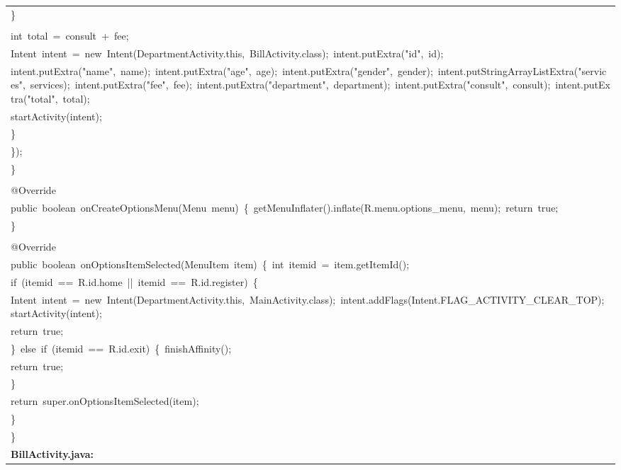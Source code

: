 \documentclass[a4paper,12pt]{article}
\begin{document}
\begin{longtable}{|p{}|}
{\ttfamily\small \}} \\
\strut \\
{\ttfamily\small int\ total\ =\ consult\ +\ fee;} \\
{\ttfamily\small Intent\ intent\ =\ new\ Intent(DepartmentActivity.this,\ BillActivity.class);\ intent.putExtra("id",\ id);} \\
{\ttfamily\small intent.putExtra("name",\ name);\ intent.putExtra("age",\ age);\ intent.putExtra("gender",\ gender);\ intent.putStringArrayListExtra("services",\ services);\ intent.putExtra("fee",\ fee);\ intent.putExtra("department",\ department);\ intent.putExtra("consult",\ consult);\ intent.putExtra("total",\ total);} \\
{\ttfamily\small startActivity(intent);} \\
{\ttfamily\small \}} \\
{\ttfamily\small \});} \\
{\ttfamily\small \}} \\
\strut \\
{\ttfamily\small @Override} \\
{\ttfamily\small public\ boolean\ onCreateOptionsMenu(Menu\ menu)\ \{\ getMenuInflater().inflate(R.menu.options\_menu,\ menu);\ return\ true;} \\
{\ttfamily\small \}} \\
\strut \\
{\ttfamily\small @Override} \\
{\ttfamily\small public\ boolean\ onOptionsItemSelected(MenuItem\ item)\ \{\ int\ itemid\ =\ item.getItemId();} \\
{\ttfamily\small if\ (itemid\ ==\ R.id.home\ ||\ itemid\ ==\ R.id.register)\ \{} \\
{\ttfamily\small Intent\ intent\ =\ new\ Intent(DepartmentActivity.this,\ MainActivity.class);\ intent.addFlags(Intent.FLAG\_ACTIVITY\_CLEAR\_TOP);\ startActivity(intent);} \\
{\ttfamily\small return\ true;} \\
{\ttfamily\small \}\ else\ if\ (itemid\ ==\ R.id.exit)\ \{\ finishAffinity();} \\
{\ttfamily\small return\ true;} \\
{\ttfamily\small \}} \\
{\ttfamily\small return\ super.onOptionsItemSelected(item);} \\
{\ttfamily\small \}} \\
{\ttfamily\small \}} \\
\hline
\rule{0pt}{13pt}\textbf{BillActivity.java:} \\

\end{longtable}
\end{document}
